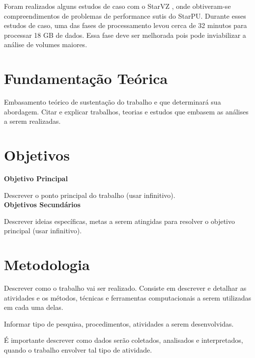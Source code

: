 \documentclass[prop-esp]{iiufrgs}
\begin{document}
Foram realizados alguns estudos de caso com o StarVZ \cite{}, onde obtiveram-se compreendimentos de problemas de performance sutis do StarPU. Durante
esses estudos de caso, uma das fases de processamento levou cerca de 32 minutos para processar 18 GB de dados. Essa fase deve ser melhorada pois pode inviabilizar a análise de volumes maiores.


%
\chapter{Fundamentação Teórica}

Embasamento teórico de sustentação do trabalho e que determinará sua abordagem. Citar e explicar trabalhos, teorias e estudos que embasem as análises a serem realizadas. 


%
\chapter{Objetivos}

\noindent \textbf{Objetivo Principal} 

Descrever o ponto principal do trabalho (usar infinitivo). \\


\noindent \textbf{Objetivos Secundários} 

Descrever ideias específicas, metas a serem atingidas para resolver o objetivo principal (usar infinitivo).


%
\chapter{Metodologia}

Descrever como o trabalho vai ser realizado. Consiste em descrever e detalhar as atividades e os métodos, técnicas e ferramentas computacionais a serem utilizadas em cada uma delas. 

Informar tipo de pesquisa, procedimentos, atividades a serem desenvolvidas.

É importante descrever como dados serão coletados, analisados e interpretados, quando o trabalho envolver tal tipo de atividade.

%
\end{document}
